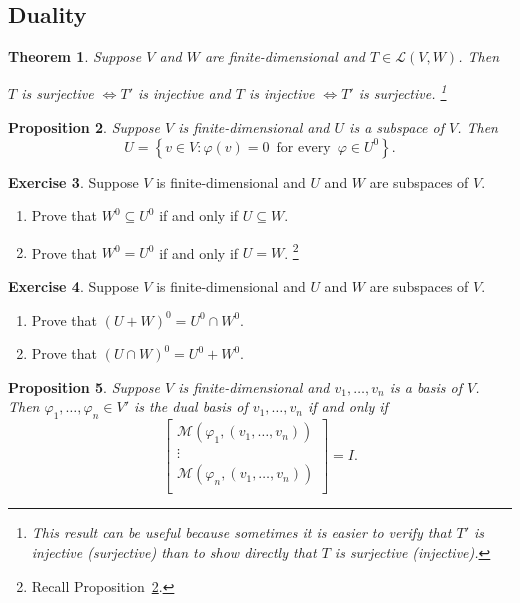 \documentclass{tufte-handout}
\theoremstyle{plain} %
\newtheorem{thm}{Theorem}
\newtheorem{prop}[thm]{Proposition}
\theoremstyle{definition}
\newtheorem{exer}[thm]{Exercise}
\theoremstyle{remark}
\newcommand{\bra}[1]{\mathopen{}\left(#1\right)}
\newcommand{\cbra}[1]{\mathopen{}\left\{#1\right\}}
\renewcommand{\phi}{\varphi}
\renewcommand{\L}{\mathcal{L}}
\newcommand{\M}{\mathcal{M}}
\begin{document}
\subsection{Duality}
\begin{thm}
	Suppose $V$ and $W$ are finite-dimensional and $T\in\L\bra{V,W}$. Then
	\begin{center}
	$T$ is surjective $\iff T'$ is injective \quad and \quad $T$ is injective $\iff T'$ is surjective.%
    \footnote{This result can be useful because sometimes it is easier to verify that $T'$ is injective (surjective) than to show directly that $T$ is surjective (injective).}
	\end{center}
\end{thm}

\begin{prop}\label{prop: relation between subspace and annihilator}
	Suppose $V$ is finite-dimensional and $U$ is a subspace of $V$. Then
	\[U=\cbra{v\in V:\phi(v)=0\,\text{ for every }\,\phi\in U^0}.\]
\end{prop}

\begin{exer}
	Suppose $V$ is finite-dimensional and $U$ and $W$ are subspaces of $V$.
	\begin{enumerate}
		\item Prove that $W^0\subseteq U^0$ if and only if $U\subseteq W$.
		\item Prove that $W^0=U^0$ if and only if $U=W$.%
    	\footnote{Recall Proposition~\ref{prop: relation between subspace and annihilator}.}
	\end{enumerate}
\end{exer}

\begin{exer}
	Suppose $V$ is finite-dimensional and $U$ and $W$ are subspaces of $V$.\
	\begin{enumerate}
		\item Prove that $\bra{U+W}^0=U^0\cap W^0$.
		\item Prove that $\bra{U\cap W}^0=U^0+W^0$.
	\end{enumerate}
\end{exer}

\begin{prop}\label{prop: matrix of dual basis}
	Suppose $V$ is finite-dimensional and $v_1,\dots,v_n$ is a basis of $V$. Then $\phi_1,\dots,\phi_n\in V'$ is the dual basis of $v_1,\dots,v_n$ if and only if
	\[\begin{bmatrix}
		\M(\phi_1,(v_1,\dots,v_n))\\
		\vdots\\
		\M(\phi_n,(v_1,\dots,v_n))\\
	\end{bmatrix}=I.\]
\end{prop}
\end{document}
